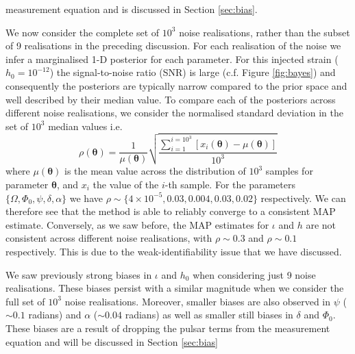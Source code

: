 \documentclass[fleqn,usenatbib,useAMS]{mnras}
\begin{document}
measurement equation and is discussed in Section \ref{sec:bias}. \newline 

We now consider the complete set of $10^3$ noise realisations, rather than the subset of 9 realisations in the preceding discussion. For each realisation of the noise we infer a marginalised 1-D posterior for each parameter. For this injected strain ($h_0 = 10^{-12}$) the signal-to-noise ratio (SNR) is large (c.f. Figure \ref{fig:bayes}) and consequently the posteriors are typically narrow compared to the prior space and well described by their median value.   To compare each of the posteriors across different noise realisations, we consider the normalised standard deviation in the set of $10^3$ median values i.e. 
\begin{equation}
	\rho \left( \boldsymbol{\theta}\right)= \frac{1}{\mu(\boldsymbol{\theta})} \sqrt{ \frac{\sum_{i=1}^{i=10^3}\left[x_i(\boldsymbol{\theta}) - \mu(\boldsymbol{\theta}) \right]}{10^3}} 
\end{equation} 
where $\mu(\boldsymbol{\theta})$ is the mean value across the distribution of $10^3$ samples for parameter $\boldsymbol{\theta}$, and $x_i$ the value of the $i$-th sample. For the parameters $\{\Omega, \Phi_0, \psi, \delta, \alpha \}$ we have $\rho \sim \{4 \times 10^{-5}, 0.03,0.004,0.03,0.02 \}$ respectively. We can therefore see that the method is able to reliably converge to a consistent MAP estimate. Conversely, as we saw before, the MAP estimates for $\iota$ and $h$ are not consistent across different noise realisations, with $\rho \sim 0.3$ and $\rho \sim 0.1$ respectively. This is due to the weak-identifiability issue that we have discussed. \newline


We saw previously strong biases in $\iota$ and $h_0$ when considering just 9 noise realisations. These biases persist with a similar magnitude when we consider the full set of $10^3$ noise realisations. Moreover, smaller biases are also observed in $\psi$ ($\sim 0.1$ radians) and $\alpha$ ($\sim 0.04$ radians) as well as smaller still biases in $\delta$ and $\Phi_0$. These biases are a result of dropping the pulsar terms from the measurement equation and will be discussed in Section \ref{sec:bias}
\end{document}
